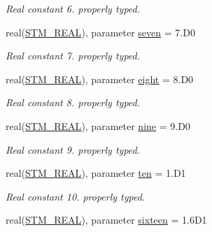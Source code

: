 \begin{CompactItemize}
\begin{CompactList}\small\item\em Real constant 6. properly typed. \item\end{CompactList}\item 
\hypertarget{a00038_35218ac59f92ecfe675ec3c445007097}{
real(\hyperlink{a00038_9b1e7e9d7f36de86830360566a430b08}{STM\_\-REAL}), parameter \hyperlink{a00038_35218ac59f92ecfe675ec3c445007097}{seven} = 7.D0}
\label{a00038_35218ac59f92ecfe675ec3c445007097}

\begin{CompactList}\small\item\em Real constant 7. properly typed. \item\end{CompactList}\item 
\hypertarget{a00038_9e5d27f3c7b5b284ccffaff1bc1a305e}{
real(\hyperlink{a00038_9b1e7e9d7f36de86830360566a430b08}{STM\_\-REAL}), parameter \hyperlink{a00038_9e5d27f3c7b5b284ccffaff1bc1a305e}{eight} = 8.D0}
\label{a00038_9e5d27f3c7b5b284ccffaff1bc1a305e}

\begin{CompactList}\small\item\em Real constant 8. properly typed. \item\end{CompactList}\item 
\hypertarget{a00038_5123ac6e1f714a826ddc815a0277d7c2}{
real(\hyperlink{a00038_9b1e7e9d7f36de86830360566a430b08}{STM\_\-REAL}), parameter \hyperlink{a00038_5123ac6e1f714a826ddc815a0277d7c2}{nine} = 9.D0}
\label{a00038_5123ac6e1f714a826ddc815a0277d7c2}

\begin{CompactList}\small\item\em Real constant 9. properly typed. \item\end{CompactList}\item 
\hypertarget{a00038_62e3557769dd387a38f536d0a78e8b9e}{
real(\hyperlink{a00038_9b1e7e9d7f36de86830360566a430b08}{STM\_\-REAL}), parameter \hyperlink{a00038_62e3557769dd387a38f536d0a78e8b9e}{ten} = 1.D1}
\label{a00038_62e3557769dd387a38f536d0a78e8b9e}

\begin{CompactList}\small\item\em Real constant 10. properly typed. \item\end{CompactList}\item 
\hypertarget{a00038_29604c5bc82b36c278a80814303cc3ca}{
real(\hyperlink{a00038_9b1e7e9d7f36de86830360566a430b08}{STM\_\-REAL}), parameter \hyperlink{a00038_29604c5bc82b36c278a80814303cc3ca}{sixteen} = 1.6D1}
\label{a00038_29604c5bc82b36c278a80814303cc3ca}


\end{CompactItemize}
